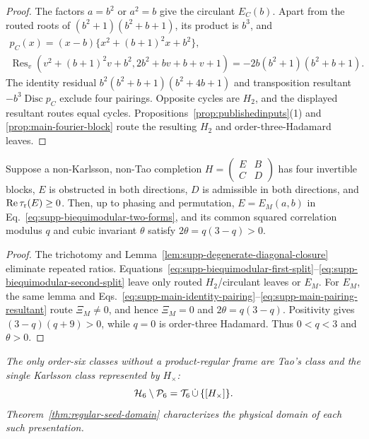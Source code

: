 \begin{proof}
{The factors $a=b^2$ or $a^2=b$ give the circulant $E_C(b)$. Apart from the routed roots of $(b^2+1)(b^2+b+1)$, its product is $b^3$, and}
\begin{equation}
{\begin{gathered}
p_C(x)=(x-b)\{x^2+(b+1)^2x+b^2\},\\
\operatorname{Res}_v\!\left(v^2+(b+1)^2v+b^2,2b^2+bv+b+v+1\right)
=-2b(b^2+1)(b^2+b+1).
\end{gathered}}
\end{equation}
{The identity residual $b^2(b^2+b+1)(b^2+4b+1)$ and transposition resultant $-b^3\operatorname{Disc}p_C$ exclude four pairings. Opposite cycles are $H_2$, and the displayed resultant routes equal cycles. Propositions~\ref{prop:publishedinputs}(1) and \ref{prop:main-fourier-block} route the resulting $H_2$ and order-three-Hadamard leaves.}
\end{proof}


\begin{corollary}
\label{cor:supp-block-polarized-normal-form}
{Suppose a non-Karlsson, non-Tao completion $H=\left(\begin{smallmatrix}E&B\\C&D\end{smallmatrix}\right)$ has four invertible blocks, $E$ is obstructed in both directions, $D$ is admissible in both directions, and $\operatorname{Re}\tau_{\rm r}(E)\ge0$.  Then, up to phasing and permutation, $E=E_M(a,b)$ in Eq.~\eqref{eq:supp-biequimodular-two-forms}, and its common squared correlation modulus $q$ and cubic invariant $\theta$ satisfy $2\theta=q(3-q)>0$.}
\end{corollary}

\begin{proof}
{The trichotomy and Lemma~\ref{lem:supp-degenerate-diagonal-closure} eliminate repeated ratios.  Equations~\eqref{eq:supp-biequimodular-first-split}--\eqref{eq:supp-biequimodular-second-split} leave only routed $H_2$/circulant leaves or $E_M$.  For $E_M$, the same lemma and Eqs.~\eqref{eq:supp-main-identity-pairing}--\eqref{eq:supp-main-pairing-resultant} route $\Xi_M\ne0$, and hence $\Xi_M=0$ and $2\theta=q(3-q)$. Positivity gives $(3-q)(q+9)>0$, while $q=0$ is order-three Hadamard. Thus $0<q<3$ and $\theta>0$.}
\end{proof}

{\emph{The only order-six classes without a product-regular frame are Tao's class and the single Karlsson class represented by $H_\times$:}}
\begin{equation}
{\mathcal H_6\setminus\mathcal P_6
=\mathcal T_6\,\dot\cup\,\{[H_\times]\}.}
\label{eq:supp-global-product-regular-reach}
\end{equation}
{\emph{Theorem~\ref{thm:regular-seed-domain} characterizes the physical domain of each such presentation.}}


